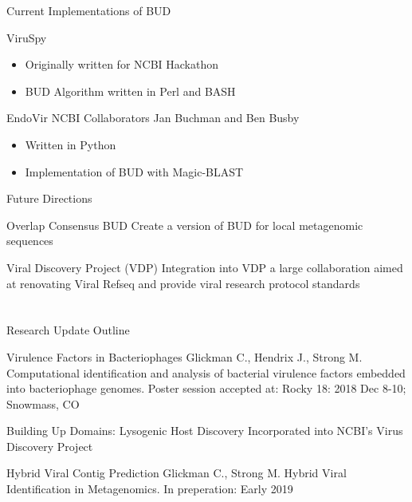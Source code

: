 \documentclass[11pt, xcolor=table]{beamer}
\begin{document}
	\begin{frame}{Current Implementations of BUD}
	\begin{block}{ViruSpy}
	\begin{itemize}
	\item Originally written for NCBI Hackathon
	\item BUD Algorithm written in Perl and BASH

	\end{itemize}
	\end{block}
	
	\begin{block}{EndoVir}
	NCBI Collaborators Jan Buchman and Ben Busby \\ 
	\begin{itemize}
	\item Written in Python
	\item Implementation of BUD with Magic-BLAST
	\end{itemize}
	\end{block}
	\end{frame}
	\begin{frame}{Future Directions}
	\begin{block}{Overlap Consensus BUD}
	Create a version of BUD for local metagenomic sequences 
	\end{block}
	
	\begin{block}{Viral Discovery Project (VDP)}
	Integration into VDP a large collaboration aimed at renovating Viral Refseq and provide viral research protocol standards
	\end{block}
	\end{frame}
	
\section{}
	\begin{frame}{Research Update Outline}
	\begin{block}{\textcolor{black!50}{Virulence Factors in Bacteriophages}}
	\textcolor{black!50}{\tiny{Glickman C., Hendrix J., Strong M. Computational identification and analysis of bacterial virulence factors embedded into bacteriophage genomes. Poster session accepted at: Rocky 18: 2018 Dec 8-10; Snowmass, CO}}
	\end{block}
	
	\begin{block}{\textcolor{black!50}{Building Up Domains: Lysogenic Host Discovery}}
  \textcolor{black!50}{Incorporated into NCBI's Virus Discovery Project}
	\end{block}

	\begin{block}{Hybrid Viral Contig Prediction}
	\tiny{Glickman C., Strong M. Hybrid Viral Identification in Metagenomics. In preperation: Early 2019}
	\end{block}
	\end{frame}
	
\end{document}
